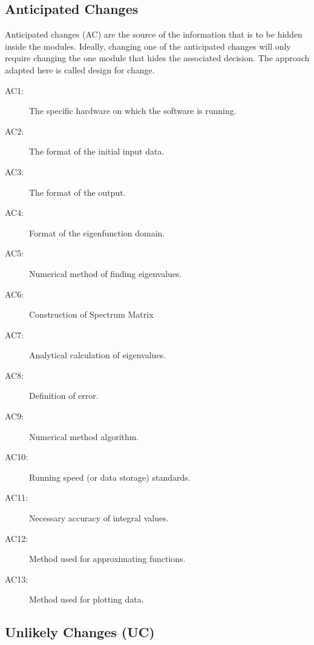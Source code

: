 \documentclass[12pt, titlepage]{article}
\begin{document}
\subsection{Anticipated Changes} \label{SecAchange}

Anticipated changes (AC) are the source of the information that is to be hidden
inside the modules. Ideally, changing one of the anticipated changes will only
require changing the one module that hides the associated decision. The approach
adapted here is called design for
change.

\begin{description}
\item[AC1:] The specific hardware on which the software is running.\\
\item[AC2:] The format of the initial input data.\\
\item[AC3:] The format of the output.\\
\item[AC4:] Format of the eigenfunction domain. \\
\item[AC5:] Numerical method of finding eigenvalues. \\ 
\item[AC6:] Construction of Spectrum Matrix \\ 
\item[AC7:] Analytical calculation of eigenvalues. \\
\item[AC8:] Definition of error. \\
\item[AC9:] Numerical method algorithm. \\ 
\item[AC10:] Running speed (or data storage) standards. \\ 
\item[AC11:] Necessary accuracy of integral values. \\ 
\item[AC12:] Method used for approximating functions. \\
\item[AC13:] Method used for plotting data. \\
\end{description}

\subsection{Unlikely Changes (UC)} \label{SecUchange}
\end{document}
